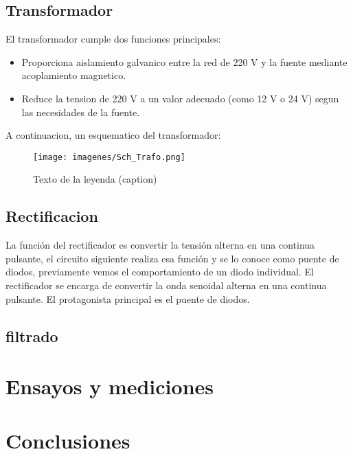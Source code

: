 \documentclass[chaptersright]{informeutn}
\begin{document}
      \section{Transformador}
        El transformador cumple dos funciones principales:
        \begin{itemize}
          \item Proporciona aislamiento galvanico entre la red de 220 V y la fuente mediante acoplamiento magnetico.
          \item Reduce la tension de 220 V a un valor adecuado (como 12 V o 24 V) segun las necesidades de la fuente.
        \end{itemize}
        A continuacion, un esquematico del transformador:
        

        \begin{figure}[h]
          \centering
          \texttt{[image: imagenes/Sch\_Trafo.png]}
          \caption{Texto de la leyenda (caption)}
          \label{fig:etiqueta}
        \end{figure}

      \section{Rectificacion}
        La función del rectificador es convertir la tensión alterna en una continua pulsante, el circuito siguiente 
        realiza esa función y se lo conoce como puente de diodos, previamente vemos el comportamiento de un diodo 
        individual.
        El rectificador se encarga de convertir la onda senoidal alterna en una continua pulsante. El protagonista
        principal es el puente de diodos.

              \section{filtrado}


  \chapter{Ensayos y mediciones}
    
  \chapter{Conclusiones}
\end{document}
